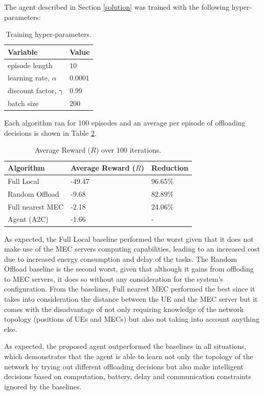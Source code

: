 The agent described in Section \ref{solution} was trained with the following hyper-parameters:

\begin{table}[H]
\centering
\begin{tabular}{|l|l|}
\hline
Variable & Value \\ \hline
episode length&$10$\\
learning rate, $\alpha$&$0.0001$\\
discount factor, $\gamma$&$0.99$\\
batch size&$200$\\ \hline
\end{tabular}
\caption{Training hyper-parameters.}\label{training_hyperparams}
\end{table}

Each algorithm ran for 100 episodes and an average per episode of offloading decisions is shown in Table \ref{resultstest1}.

\begin{table}[H]
\centering
\begin{tabular}{|l|l|l|}
\hline
Algorithm        & Average Reward ($R$) & Reduction\\ \hline
Full Local       & -49.47 & 96.65\%\\
Random Offload   & -9.68 & 82.89\%\\
Full nearest MEC & -2.18 & 24.06\%\\ 
Agent (A2C) & -1.66 & -\\ \hline
\end{tabular}
\caption{Average Reward ($R$) over 100 iterations.} \label{resultstest1}
\end{table}

As expected, the Full Local baseline performed the worst given that it does not make use of the \acrshort{MEC} servers computing capabilities, leading to an increased cost due to increased energy consumption and delay of the tasks. The Random Offload baseline is the second worst, given that although it gains from offloding to \acrshort{MEC} servers, it does so without any consideration for the system's configuration. From the baselines, Full nearest MEC performed the best since it takes into consideration the distance between the \acrshort{UE} and the \acrshort{MEC} server but it comes with the disadvantage of not only requiring knowledge of the network topology (positions of \acrshort{UE}s and \acrshort{MEC}s) but also not taking into account anything else. 

As expected, the proposed agent outperformed the baselines in all situations, which demonstrates that the agent is able to learn not only the topology of the network by trying out different offloading decisions but also make intelligent decisions based on computation, battery, delay and communication constraints ignored by the baselines.

